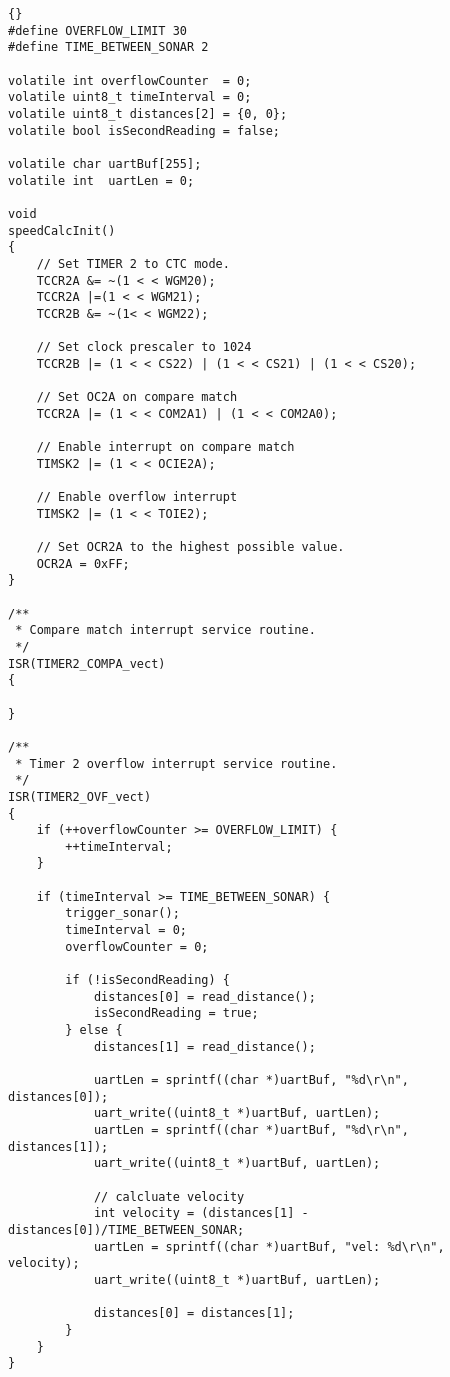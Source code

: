 \begin{lstlisting}[frame=trbl]{}
#define OVERFLOW_LIMIT 30
#define TIME_BETWEEN_SONAR 2

volatile int overflowCounter  = 0;
volatile uint8_t timeInterval = 0;
volatile uint8_t distances[2] = {0, 0};
volatile bool isSecondReading = false;

volatile char uartBuf[255];
volatile int  uartLen = 0;

void 
speedCalcInit()
{
    // Set TIMER 2 to CTC mode.
    TCCR2A &= ~(1 < < WGM20);
    TCCR2A |=(1 < < WGM21);
    TCCR2B &= ~(1< < WGM22);

    // Set clock prescaler to 1024
    TCCR2B |= (1 < < CS22) | (1 < < CS21) | (1 < < CS20);

    // Set OC2A on compare match
    TCCR2A |= (1 < < COM2A1) | (1 < < COM2A0);

    // Enable interrupt on compare match
    TIMSK2 |= (1 < < OCIE2A);

    // Enable overflow interrupt
    TIMSK2 |= (1 < < TOIE2);

    // Set OCR2A to the highest possible value.
    OCR2A = 0xFF;
}

/**
 * Compare match interrupt service routine.
 */
ISR(TIMER2_COMPA_vect)
{

}

/**
 * Timer 2 overflow interrupt service routine.
 */
ISR(TIMER2_OVF_vect)
{
    if (++overflowCounter >= OVERFLOW_LIMIT) {
        ++timeInterval;
    }

    if (timeInterval >= TIME_BETWEEN_SONAR) {
        trigger_sonar();
        timeInterval = 0;
        overflowCounter = 0;

        if (!isSecondReading) {
            distances[0] = read_distance();
            isSecondReading = true;
        } else {
            distances[1] = read_distance();

            uartLen = sprintf((char *)uartBuf, "%d\r\n", distances[0]);
            uart_write((uint8_t *)uartBuf, uartLen);
            uartLen = sprintf((char *)uartBuf, "%d\r\n", distances[1]);
            uart_write((uint8_t *)uartBuf, uartLen);

            // calcluate velocity
            int velocity = (distances[1] - distances[0])/TIME_BETWEEN_SONAR;
            uartLen = sprintf((char *)uartBuf, "vel: %d\r\n", velocity);
            uart_write((uint8_t *)uartBuf, uartLen);

            distances[0] = distances[1];
        }
    }
}
\end{lstlisting}

